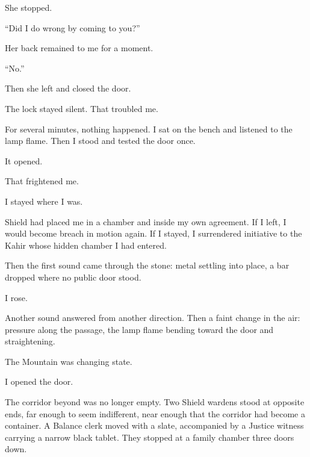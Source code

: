 She stopped.\par

``Did I do wrong by coming to you?''\par

Her back remained to me for a moment.\par

``No.''\par

Then she left and closed the door.\par

The lock stayed silent. That troubled me.\par

For several minutes, nothing happened. I sat on the bench and listened to the lamp flame. Then I stood and tested the door once.\par

It opened.\par

That frightened me.\par

I stayed where I was.\par

Shield had placed me in a chamber and inside my own agreement. If I left, I would become breach in motion again. If I stayed, I surrendered initiative to the Kahir whose hidden chamber I had entered.\par

Then the first sound came through the stone: metal settling into place, a bar dropped where no public door stood.\par

I rose.\par

Another sound answered from another direction. Then a faint change in the air: pressure along the passage, the lamp flame bending toward the door and straightening.\par

The Mountain was changing state.\par

I opened the door.\par

The corridor beyond was no longer empty. Two Shield wardens stood at opposite ends, far enough to seem indifferent, near enough that the corridor had become a container. A Balance clerk moved with a slate, accompanied by a Justice witness carrying a narrow black tablet. They stopped at a family chamber three doors down.\par

